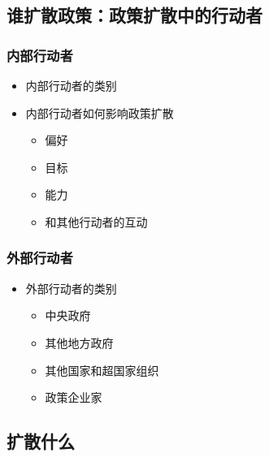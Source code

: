\documentclass[
  12pt,
]{ctexart}
\begin{document}
\hypertarget{ux8c01ux6269ux6563ux653fux7b56ux653fux7b56ux6269ux6563ux4e2dux7684ux884cux52a8ux8005}{%
\subsection{谁扩散政策：政策扩散中的行动者}\label{ux8c01ux6269ux6563ux653fux7b56ux653fux7b56ux6269ux6563ux4e2dux7684ux884cux52a8ux8005}}

\hypertarget{ux5185ux90e8ux884cux52a8ux8005}{%
\subsubsection{内部行动者}\label{ux5185ux90e8ux884cux52a8ux8005}}

\begin{itemize}
\item
  内部行动者的类别
\item
  内部行动者如何影响政策扩散

  \begin{itemize}
  \item
    偏好
  \item
    目标
  \item
    能力
  \item
    和其他行动者的互动
  \end{itemize}
\end{itemize}

\hypertarget{ux5916ux90e8ux884cux52a8ux8005}{%
\subsubsection{外部行动者}\label{ux5916ux90e8ux884cux52a8ux8005}}

\begin{itemize}
\item
  外部行动者的类别

  \begin{itemize}
  \item
    中央政府
  \item
    其他地方政府
  \item
    其他国家和超国家组织
  \item
    政策企业家
  \end{itemize}
\end{itemize}

\hypertarget{ux6269ux6563ux4ec0ux4e48}{%
\subsection{扩散什么}\label{ux6269ux6563ux4ec0ux4e48}}
\end{document}
